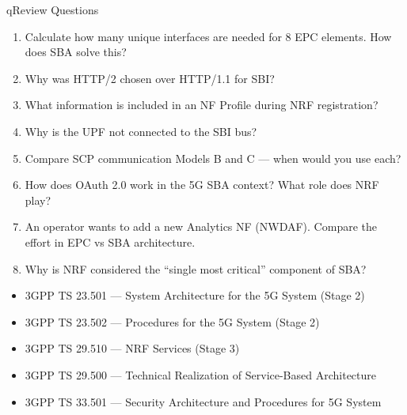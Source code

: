 
\begin{CNbox}[unbreakable]{q}{Review Questions}

\begin{enumerate}
\def\labelenumi{\arabic{enumi}.}
\tightlist
\item
  Calculate how many unique interfaces are needed for 8 EPC elements. How does SBA solve this?
\item
  Why was HTTP/\allowbreak{}2 chosen over HTTP/\allowbreak{}1.1 for SBI?
\item
  What information is included in an NF Profile during NRF registration?
\item
  Why is the UPF not connected to the SBI bus?
\item
  Compare SCP communication Models B and C — when would you use each?
\item
  How does OAuth 2.0 work in the 5G SBA context? What role does NRF play?
\item
  An operator wants to add a new Analytics NF (NWDAF). Compare the effort in EPC vs SBA architecture.
\item
  Why is NRF considered the ``single most critical'' component of SBA?
\end{enumerate}

\end{CNbox}


\begin{itemize}
\tightlist
\item
  3GPP TS 23.501 — System Architecture for the 5G System (Stage 2)
\item
  3GPP TS 23.502 — Procedures for the 5G System (Stage 2)
\item
  3GPP TS 29.510 — NRF Services (Stage 3)
\item
  3GPP TS 29.500 — Technical Realization of Service-Based Architecture
\item
  3GPP TS 33.501 — Security Architecture and Procedures for 5G System
\end{itemize}
